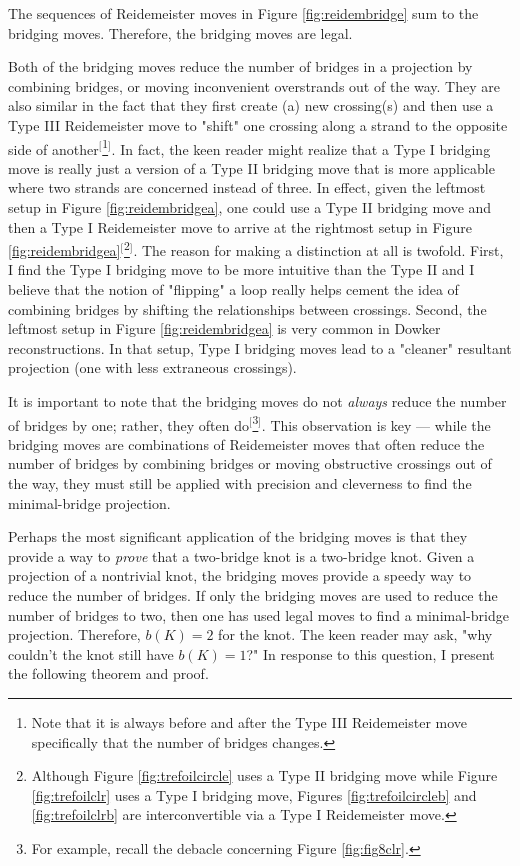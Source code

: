 \documentclass[titlepage]{article}
\begin{document}
The sequences of Reidemeister moves in Figure \ref{fig:reidembridge} sum to the bridging moves. Therefore, the bridging moves are legal.\par
Both of the bridging moves reduce the number of bridges in a projection by combining bridges, or moving inconvenient overstrands out of the way. They are also similar in the fact that they first create (a) new crossing(s) and then use a Type III Reidemeister move to "shift" one crossing along a strand to the opposite side of another$^[$\footnote{Note that it is always before and after the Type III Reidemeister move specifically that the number of bridges changes.}$^]$. In fact, the keen reader might realize that a Type I bridging move is really just a version of a Type II bridging move that is more applicable where two strands are concerned instead of three. In effect, given the leftmost setup in Figure \ref{fig:reidembridgea}, one could use a Type II bridging move and then a Type I Reidemeister move to arrive at the rightmost setup in Figure \ref{fig:reidembridgea}$^[$\footnote{Although Figure \ref{fig:trefoilcircle} uses a Type II bridging move while Figure \ref{fig:trefoilclr} uses a Type I bridging move, Figures \ref{fig:trefoilcircleb} and \ref{fig:trefoilclrb} are interconvertible via a Type I Reidemeister move.}$^]$. The reason for making a distinction at all is twofold. First, I find the Type I bridging move to be more intuitive than the Type II and I believe that the notion of "flipping" a loop really helps cement the idea of combining bridges by shifting the relationships between crossings. Second, the leftmost setup in Figure \ref{fig:reidembridgea} is very common in Dowker reconstructions. In that setup, Type I bridging moves lead to a "cleaner" resultant projection (one with less extraneous crossings).\par
It is important to note that the bridging moves do not \emph{always} reduce the number of bridges by one; rather, they often do$^[$\footnote{For example, recall the debacle concerning Figure \ref{fig:fig8clr}.}$^]$. This observation is key --- while the bridging moves are combinations of Reidemeister moves that often reduce the number of bridges by combining bridges or moving obstructive crossings out of the way, they must still be applied with precision and cleverness to find the minimal-bridge projection.\par
Perhaps the most significant application of the bridging moves is that they provide a way to \emph{prove} that a two-bridge knot is a two-bridge knot. Given a projection of a nontrivial knot, the bridging moves provide a speedy way to reduce the number of bridges. If only the bridging moves are used to reduce the number of bridges to two, then one has used legal moves to find a minimal-bridge projection. Therefore, $b(K)=2$ for the knot. The keen reader may ask, "why couldn't the knot still have $b(K)=1$?" In response to this question, I present the following theorem and proof.
\end{document}
